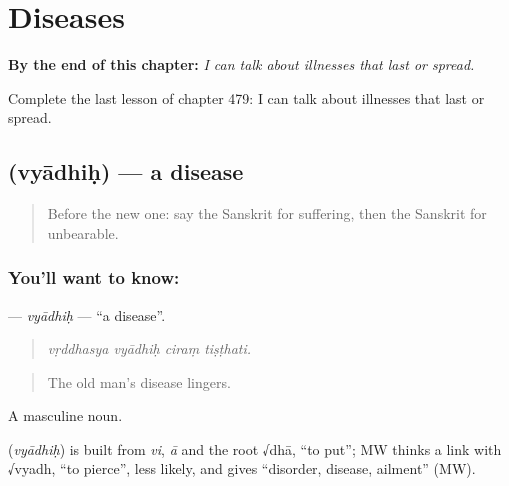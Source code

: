 
\chapter{Diseases}
\label{ch:sa-diseases}

\begin{chapteropening}
\textbf{By the end of this chapter:} \emph{I can talk about illnesses that last or spread.}

Complete the last lesson of chapter 479: I can talk about illnesses that last or spread.
\end{chapteropening}

\section[\texorpdfstring{\sk{व्याधिः} (vyādhiḥ)}{व्याधिः (vyādhiḥ)}]{ (vyādhiḥ) — a disease}

\label{lesson:SA-C479-vyadhih}



\begin{quote}
Before the new one: say the Sanskrit for suffering, then the Sanskrit for unbearable.
\end{quote}

\subsection*{You'll want to know: }
\textbf{} — \emph{vyādhiḥ} — \textquotedblleft{}a disease\textquotedblright{}.

\begin{quote}
   
\end{quote}

\begin{quote}
\emph{vṛddhasya vyādhiḥ ciraṃ tiṣṭhati.}
\end{quote}

\begin{quote}
The old man's disease lingers.
\end{quote}

A masculine noun.

\begin{cousinweb}
\textbf{} (\emph{vyādhiḥ}) is built from \emph{vi}, \emph{ā} and the root √dhā, \textquotedblleft{}to put\textquotedblright{}; MW thinks a link with √vyadh, \textquotedblleft{}to pierce\textquotedblright{}, less likely, and gives \textquotedblleft{}disorder, disease, ailment\textquotedblright{} (MW).
\end{cousinweb}

